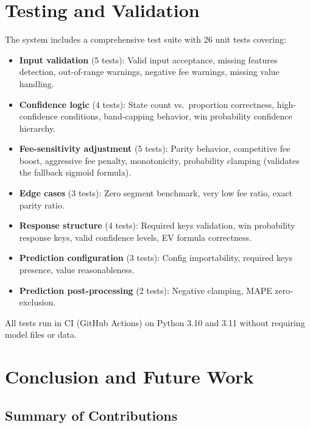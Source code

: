 \documentclass[12pt,a4paper]{article}
\begin{document}
\section{Testing and Validation}

The system includes a comprehensive test suite with 26 unit tests covering:

\begin{itemize}[nosep]
    \item \textbf{Input validation} (5 tests): Valid input acceptance, missing features detection, out-of-range warnings, negative fee warnings, missing value handling.
    \item \textbf{Confidence logic} (4 tests): State count vs.\ proportion correctness, high-confidence conditions, band-capping behavior, win probability confidence hierarchy.
    \item \textbf{Fee-sensitivity adjustment} (5 tests): Parity behavior, competitive fee boost, aggressive fee penalty, monotonicity, probability clamping (validates the fallback sigmoid formula).
    \item \textbf{Edge cases} (3 tests): Zero segment benchmark, very low fee ratio, exact parity ratio.
    \item \textbf{Response structure} (4 tests): Required keys validation, win probability response keys, valid confidence levels, EV formula correctness.
    \item \textbf{Prediction configuration} (3 tests): Config importability, required keys presence, value reasonableness.
    \item \textbf{Prediction post-processing} (2 tests): Negative clamping, MAPE zero-exclusion.
\end{itemize}

All tests run in CI (GitHub Actions) on Python 3.10 and 3.11 without requiring model files or data.

\section{Conclusion and Future Work}

\subsection{Summary of Contributions}
\end{document}
